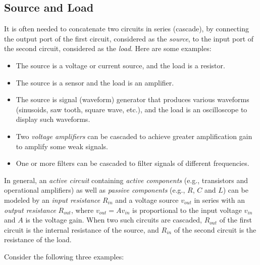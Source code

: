 \documentclass{article}
\begin{document}


\subsection*{Source and Load}

It is often needed to concatenate two circuits in series (cascade),
by connecting the output port of the first circuit, considered as 
the {\em source}, to the input port of the second circuit, considered 
as the {\em load}. Here are some examples: 
\begin{itemize}
\item The source is a voltage or current source, and the load is 
  a resistor.
\item The source is a sensor and the load is an amplifier.
\item The source is signal (waveform) generator that produces various
  waveforms (sinusoids, saw tooth, square wave, etc.), and the load is 
  an oscilloscope to display such waveforms. 
\item Two {\em voltage amplifiers} can be cascaded to achieve greater
  amplification gain to amplify some weak signals.
\item One or more filters can be cascaded to filter signals of 
  different frequencies.
\end{itemize}

In general, an {\em active circuit} containing {\em active components}
(e.g., transistors and operational amplifiers) as well as 
{\em passive components} (e.g., $R$, $C$ and $L$) can be modeled by an 
{\em input resistance} $R_{in}$ and a voltage source $v_{out}$ in series 
with an {\em output resistance} $R_{out}$, where $v_{out}=Av_{in}$ is 
proportional to the input voltage $v_{in}$ and $A$ is the voltage gain. 
When two such circuits are cascaded, $R_{out}$ of the first circuit is 
the internal resistance of the source, and $R_{in}$ of the second circuit 
is the resistance of the load.


Consider the following three examples:
\end{document}
